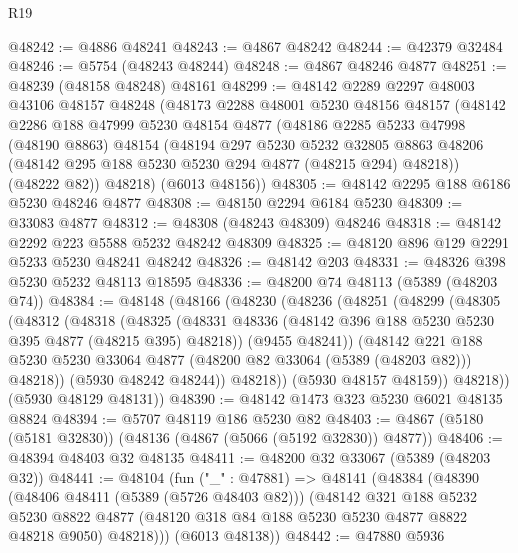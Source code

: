 \begin{lexlean}{R19}
\begin{coremodule}
@48242 := @4886 @48241
@48243 := @4867 @48242
@48244 := @42379 @32484
@48246 := @5754 (@48243 @48244)
@48248 := @4867 @48246 @4877
@48251 := @48239 (@48158 @48248) @48161
@48299 := @48142
    @2289
    @2297
    @48003
    @43106
    @48157
    @48248
    (@48173
      @2288
      @48001
      @5230
      @48156
      @48157
      (@48142
        @2286
        @188
        @47999
        @5230
        @48154
        @4877
        (@48186
          @2285
          @5233
          @47998
          (@48190 @8863)
          @48154
          (@48194
            @297
            @5230
            @5232
            @32805
            @8863
            @48206
            (@48142 @295 @188 @5230 @5230 @294 @4877 (@48215 @294) @48218))
          (@48222 @82))
        @48218)
      (@6013 @48156))
@48305 := @48142 @2295 @188 @6186 @5230 @48246 @4877
@48308 := @48150 @2294 @6184 @5230
@48309 := @33083 @4877
@48312 := @48308 (@48243 @48309) @48246
@48318 := @48142 @2292 @223 @5588 @5232 @48242 @48309
@48325 := @48120 @896 @129 @2291 @5233 @5230 @48241 @48242
@48326 := @48142 @203
@48331 := @48326 @398 @5230 @5232 @48113 @18595
@48336 := @48200 @74 @48113 (@5389 (@48203 @74))
@48384 := @48148
    (@48166
      (@48230
        (@48236
          (@48251
            (@48299
              (@48305
                (@48312
                  (@48318
                    (@48325
                      (@48331 @48336 (@48142 @396 @188 @5230 @5230 @395 @4877 (@48215 @395) @48218))
                      (@9455 @48241))
                    (@48142
                      @221
                      @188
                      @5230
                      @5230
                      @33064
                      @4877
                      (@48200 @82 @33064 (@5389 (@48203 @82)))
                      @48218))
                  (@5930 @48242 @48244))
                @48218))
            (@5930 @48157 @48159))
          @48218))
      (@5930 @48129 @48131))
@48390 := @48142 @1473 @323 @5230 @6021 @48135 @8824
@48394 := @5707 @48119 @186 @5230 @82
@48403 := @4867 (@5180 (@5181 @32830)) (@48136 (@4867 (@5066 (@5192 @32830)) @4877))
@48406 := @48394 @48403 @32 @48135
@48411 := @48200 @32 @33067 (@5389 (@48203 @32))
@48441 := @48104
    (fun ("_" : @47881) =>
    @48141
      (@48384
        (@48390
          (@48406 @48411 (@5389 (@5726 @48403 @82)))
          (@48142
            @321
            @188
            @5232
            @5230
            @8822
            @4877
            (@48120 @318 @84 @188 @5230 @5230 @4877 @8822 @48218 @9050)
            @48218)))
      (@6013 @48138))
@48442 := @47880 @5936

\end{coremodule}
\end{lexlean}
